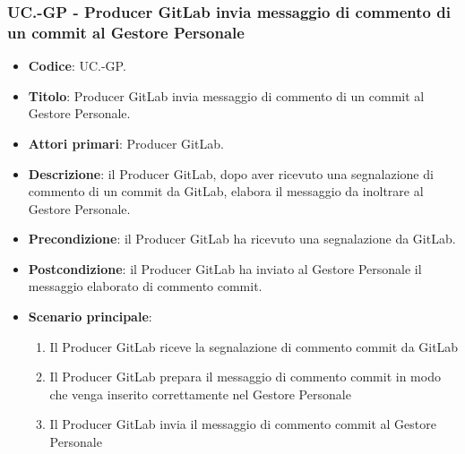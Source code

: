 		\subsubsection{UC\theuccount.\thesubuccount-GP - Producer GitLab invia messaggio di commento di un commit al Gestore Personale}
		\begin{itemize}
			\item \textbf{Codice}: UC\theuccount.\thesubuccount-GP.
			\item \textbf{Titolo}: Producer GitLab invia messaggio di commento di un commit al Gestore Personale.
			\item \textbf{Attori primari}: Producer GitLab.
			\item \textbf{Descrizione}: il Producer GitLab, dopo aver ricevuto una segnalazione di commento di un commit da GitLab, elabora il messaggio da inoltrare al Gestore Personale.
			\item \textbf{Precondizione}: il Producer GitLab ha ricevuto una segnalazione da GitLab.
			\item \textbf{Postcondizione}: il Producer GitLab ha inviato al Gestore Personale il messaggio
			elaborato di commento commit.
			\item \textbf{Scenario principale}:
			\begin{enumerate}
				\item Il Producer GitLab riceve la segnalazione di commento commit da GitLab
				\item Il Producer GitLab prepara il messaggio di commento commit in modo che venga inserito correttamente nel Gestore Personale
				\item Il Producer GitLab invia il messaggio di commento commit al Gestore Personale
			\end{enumerate}
		\end{itemize}
